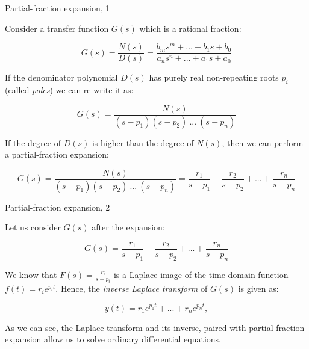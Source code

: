 \documentclass{beamer}
\begin{document}
\begin{frame}{Partial-fraction expansion, 1}
	\begin{flushleft}
		
		Consider a transfer function $G(s)$ which is a rational fraction:
		
		\begin{equation}
			G(s) = \frac{N(s)}{D(s)} = \frac{b_m s^m + ... + b_1 s + b_0}{a_n s^n + ... + a_1 s + a_0}
		\end{equation}		
		
		If the denominator polynomial $D(s)$ has purely real non-repeating roots $p_i$ (called \emph{poles}) we can re-write it as:
		
		\begin{equation}
			G(s) = \frac{N(s)}{(s - p_1)(s - p_2) \ ... \ (s - p_n)}
		\end{equation}		
		
		
		If the degree of $D(s)$ is higher than the degree of $N(s)$, then we can perform a partial-fraction expansion:
		
		\begin{equation*}
			G(s) = \frac{N(s)}{(s - p_1)(s - p_2) \ ... \ (s - p_n)} = \frac{r_1}{s - p_1} + \frac{r_2}{s - p_2} + ... + \frac{r_n}{s - p_n}
		\end{equation*}		
		
		
	\end{flushleft}
\end{frame}




\begin{frame}{Partial-fraction expansion, 2}
	\begin{flushleft}
		
		Let us consider $G(s)$ after the expansion:
		
		\begin{equation*}
			G(s) =\frac{r_1}{s - p_1} + \frac{r_2}{s - p_2} + ... + \frac{r_n}{s - p_n}
		\end{equation*}		
		
		We know that $F(s) = \frac{r_i}{s - p_i} $ is a Laplace image of the time domain function $f(t) = r_i e^{p_i t}$. Hence, the \emph{inverse Laplace transform} of $G(s)$ is given as:
		
		\begin{equation*}
			y(t) =r_1 e^{p_1 t} + ... + r_n e^{p_n t},
		\end{equation*}		
		
		As we can see, the Laplace transform and its inverse, paired with partial-fraction expansion allow us to solve ordinary differential equations.
		
	\end{flushleft}
\end{frame}
\end{document}

